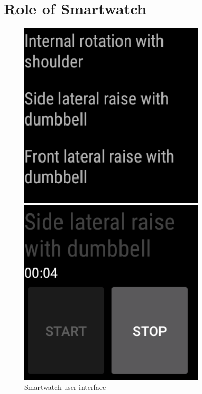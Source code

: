 \section{Role of Smartwatch}

\begin{figure}[b!]
  \centering
    \begin{minipage}{0.20\textwidth}
      \centering
        \includegraphics[width=0.80\textwidth]{00_resources/figures/Android_Watch_ListView.png}
    \end{minipage}
    \begin{minipage}{0.20\textwidth}
      \centering
        \includegraphics[width=0.80\textwidth]{00_resources/figures/Android_Watch_RecordView.png}
    \end{minipage}
  \caption{Smartwatch user interface}
  \label{fig:smwui}
\end{figure}


